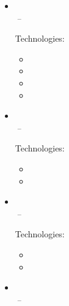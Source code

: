 \documentclass[11pt,a4paper]{article}
\begin{document}
\begin{itemize}[leftmargin=0pt,label={},itemsep=2em,topsep=0pt]
\item \parbox{\textwidth}{\textbf{\KempenName} \hfill \textit{\KempenLocation}}\\
\textit{\KempenSecondJobTitle} \hfill \textit{\KempenFirstJobStart\,--\,\KempenSecondJobEnd}

\vspace{0.2cm}
{\color{secondary}Technologies:} \KempenTechnology
\vspace{0.3cm}
\begin{itemize}[leftmargin=*,topsep=-6pt,parsep=0pt,partopsep=0pt,itemsep=0pt]
    \item \KempenTraining
    \item \KempenIndexing
    \item \KempenTrading
    \item \KempenWorkflow
\end{itemize}


\item \parbox{\textwidth}{\textbf{\UnisysName} \hfill \textit{\UnisysLocation}}\\
\textit{\UnisysJobTitle} \hfill \textit{\UnisysJobStart\,--\,\UnisysJobEnd}

\vspace{0.2cm}
{\color{secondary}Technologies:} \UnisysTechnology
\vspace{0.3cm}
\begin{itemize}[leftmargin=*,topsep=-6pt,parsep=0pt,partopsep=0pt,itemsep=0pt]
    \item \UnisysShort
    \item \UnisysDotNet
\end{itemize}


\item \parbox{\textwidth}{\textbf{\ACTName} \hfill \textit{\ACTLocation}}\\
\textit{\ACTJobTitle} \hfill \textit{\ACTJobStart\,--\,\ACTJobEnd}

\vspace{0.2cm}
{\color{secondary}Technologies:} \ACTTechnology
\vspace{0.3cm}
\begin{itemize}[leftmargin=*,topsep=-6pt,parsep=0pt,partopsep=0pt,itemsep=0pt]
    \item \ACTShort
    \item \ACTVB
\end{itemize}


\item \parbox{\textwidth}{\textbf{\HSBCName} \hfill \textit{\HSBCLocation}}\\
\textit{\HSBCJobTitle} \hfill \textit{\HSBCJobStart\,--\,\HSBCJobEnd}


\end{itemize}
\end{document}
